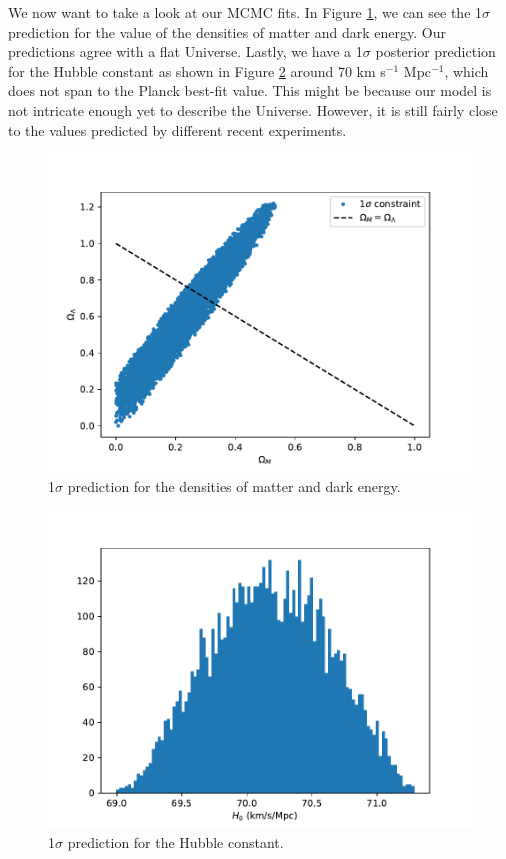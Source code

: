 \documentclass{aa}
\begin{document}
We now want to take a look at our MCMC fits. In Figure \ref{fig:fitting}, we can see the 1$\sigma$ prediction for the value of the densities of matter and dark energy. Our predictions agree with a flat Universe. Lastly, we have a 1$\sigma$ posterior prediction for the Hubble constant as shown in Figure \ref{fit:hist} around 70 km s$^{-1}$ Mpc$^{-1}$, which does not span to the Planck best-fit value. This might be because our model is not intricate enough yet to describe the Universe. However, it is still fairly close to the values predicted by different recent experiments.

\begin{figure}[ht]
\centering
\includegraphics[width=\hsize]{figures/fitting.pdf}
  \caption{1$\sigma$ prediction for the densities of matter and dark energy.}
     \label{fig:fitting}
\end{figure}

\begin{figure}[ht]
\centering
\includegraphics[width=\hsize]{figures/histogram.pdf}
  \caption{1$\sigma$ prediction for the Hubble constant.}
     \label{fit:hist}
\end{figure}
\end{document}
